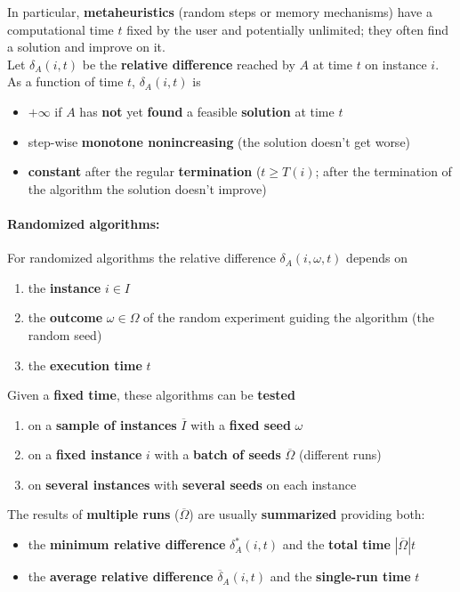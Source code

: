 \documentclass[11pt]{article}
\begin{document}
	In particular, \textbf{metaheuristics} (random steps or memory mechanisms) have a computational time $t$ fixed by the user and potentially unlimited; they often find a solution and improve on it.\\
	
	Let $\delta_A (i, t)$ be the \textbf{relative difference} reached by $A$ at time $t$ on instance $i$.\\
	As a function of time $t$, $\delta_A (i, t)$ is
	\begin{itemize}
		\item $+ \infty$ if $A$ has \textbf{not} yet \textbf{found} a feasible \textbf{solution} at time $t$
		\item step-wise \textbf{monotone nonincreasing} (the solution doesn't get worse)
		\item \textbf{constant} after the regular \textbf{termination} ($t \geq T (i)$; after the termination of the algorithm the solution doesn't improve)
	\end{itemize}
	
	\vfill
	
	\paragraph{Randomized algorithms:} For randomized algorithms the relative difference $\delta_A (i, \omega, t)$ depends on
	\begin{enumerate}
		\item the \textbf{instance} $i \in I$
		\item the \textbf{outcome} $\omega \in \Omega$ of the random experiment guiding the algorithm (the random seed)
		\item the \textbf{execution time} $t$
	\end{enumerate}
	
	Given a \textbf{fixed time}, these algorithms can be \textbf{tested}
	\begin{enumerate}
		\item on a \textbf{sample of instances} $\overline{I}$ with a \textbf{fixed seed} $\omega$
		\item on a \textbf{fixed instance} $i$ with a \textbf{batch of seeds} $\overline{\Omega}$ (different runs)
		\item on \textbf{several instances} with \textbf{several seeds} on each instance
	\end{enumerate}
	
	The results of \textbf{multiple runs} ($\overline{\Omega}$) are usually \textbf{summarized} providing both:
	\begin{itemize}
		\item the \textbf{minimum relative difference} $\delta_A^\ast (i, t)$ and the \textbf{total time} $|\overline{\Omega}|t$
		\item the \textbf{average relative difference} $\overline{\delta}_A (i, t)$ and the \textbf{single-run time} $t$
	\end{itemize}
	
\end{document}

